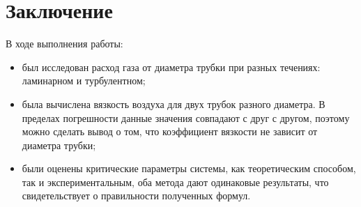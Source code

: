 \documentclass[a4paper, 12pt]{article}
\begin{document}
    \section*{Заключение}

    \noindent В ходе выполнения работы:

    \begin{itemize}
    
        \item был исследован расход газа от диаметра трубки при разных течениях: ламинарном и турбулентном;
    
        \item была вычислена вязкость воздуха для двух трубок разного диаметра. В пределах погрешности данные значения совпадают с друг с другом, поэтому можно сделать вывод о том, что коэффициент вязкости не зависит от диаметра трубки;
        
        \item были оценены критические параметры системы, как теоретическим способом, так и экспериментальным, оба метода дают одинаковые результаты, что свидетельствует о правильности полученных формул.
        
    \end{itemize}
\end{document}
